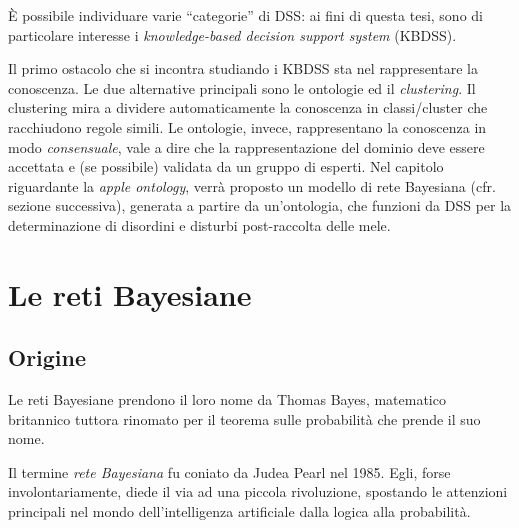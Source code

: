 È possibile individuare varie ``categorie'' di DSS: ai fini di questa tesi, sono di particolare interesse i \textit{knowledge-based decision support system} (KBDSS). 

Il primo ostacolo che si incontra studiando i KBDSS sta nel rappresentare la conoscenza. Le due alternative principali sono le ontologie ed il \textit{clustering}\cite{liu2014knowledge}. Il clustering mira a dividere automaticamente la conoscenza in classi/cluster che racchiudono regole simili. Le ontologie, invece, rappresentano la conoscenza in modo \textit{consensuale}, vale a dire che la rappresentazione del dominio deve essere accettata e (se possibile) validata da un gruppo di esperti. Nel capitolo riguardante la \textit{apple ontology}, verrà proposto un modello di rete Bayesiana (cfr. sezione successiva), generata a partire da un'ontologia, che funzioni da DSS per la determinazione di disordini e disturbi post-raccolta delle mele.


\section{Le reti Bayesiane}
\subsection{Origine}
Le reti Bayesiane prendono il loro nome da Thomas Bayes, matematico britannico tuttora rinomato per il teorema sulle probabilità che prende il suo nome. 

Il termine \textit{rete Bayesiana} fu coniato da Judea Pearl nel 1985. Egli, forse involontariamente, diede il via ad una piccola rivoluzione, spostando le attenzioni principali nel mondo dell'intelligenza artificiale dalla logica alla probabilità.\cite{stella2018}



